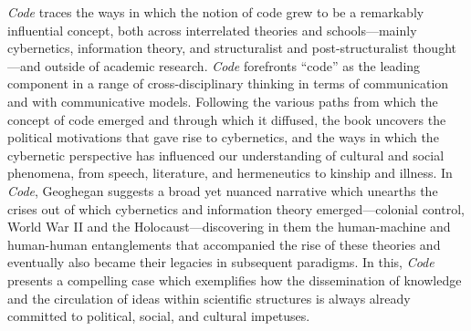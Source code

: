 \documentclass{tufte-handout}
\begin{document}
\begin{titlepage}
\vspace{2em}

\noindent\emph{Code} traces the ways in which the notion of code grew to be a
remarkably influential concept, both across interrelated theories and
schools---mainly cybernetics, information theory, and structuralist and
post-structuralist thought---and outside of academic research.
\emph{Code} forefronts ``code'' as the leading component in a range of
cross-disciplinary thinking in terms of communication and with
communicative models. Following the various paths from which the concept
of code emerged and through which it diffused, the book uncovers the
political motivations that gave rise to cybernetics, and the ways in
which the cybernetic perspective has influenced our understanding of
cultural and social phenomena, from speech, literature, and hermeneutics
to kinship and illness. In \emph{Code}, Geoghegan suggests a broad yet
nuanced narrative which unearths the crises out of which cybernetics and
information theory emerged---colonial control, World War II and the
Holocaust---discovering in them the human-machine and human-human
entanglements that accompanied the rise of these theories and eventually
also became their legacies in subsequent paradigms. In this, \emph{Code}
presents a compelling case which exemplifies how the dissemination of
knowledge and the circulation of ideas within scientific structures is
always already committed to political, social, and cultural impetuses.



\enlargethispage{2\baselineskip}

\vspace*{2em}



 \end{titlepage}

\end{document}
